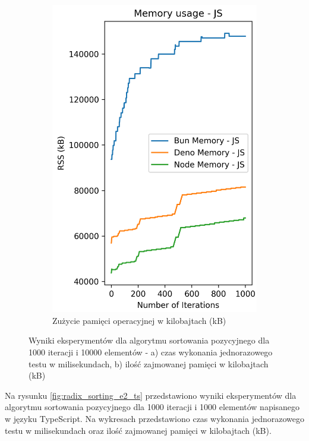 \begin{figure}[H]
\begin{subfigure}[b]{0.42\textwidth}
    \includegraphics[width=\textwidth]{Figures/sorting/sorting_radix_1000_1000_js_memory.png}
    \caption{Zużycie pamięci operacyjnej w kilobajtach (kB)}
    \label{fig:radix_sorting_e2_memory}
  \end{subfigure}
  \caption{Wyniki eksperymentów dla algorytmu sortowania pozycyjnego dla 1000 iteracji i 10000 elementów - a) czas wykonania jednorazowego testu w milisekundach, b) ilość zajmowanej pamięci w kilobajtach (kB)}
  \label{fig:radix_sorting_e2}
\end{figure}

Na rysunku \ref{fig:radix_sorting_e2_ts} przedstawiono wyniki eksperymentów dla algorytmu sortowania pozycyjnego dla 1000 iteracji i 1000 elementów napisanego w języku TypeScript. Na wykresach przedstawiono czas wykonania jednorazowego testu w milisekundach oraz ilość zajmowanej pamięci w kilobajtach (kB).

